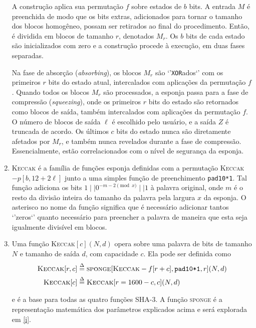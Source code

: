 \documentclass{article}
\begin{document}
\begin{enumerate}[label=(\alph*)]
A construção aplica sua permutação $f$ sobre estados de $b$ bits. A entrada
$M$ é preenchida de modo que os bits extras, adicionados para tornar o tamanho
dos blocos homogêneo, possam ser retirados ao final do procedimento. Então, é
dividida em blocos de tamanho $r$, denotados $M_r$. Os $b$ bits de cada estado
são inicializados com zero e a construção procede à execução, em duas fases
separadas.

Na fase de absorção (\emph{absorbing}), os blocos $M_r$ são `'\verb!XOR!ados`'
com os primeiros $r$ bits do estado atual, intercalados com aplicações da
permutação $f$. Quando todos os blocos $M_r$ são processados, a esponja passa
para a fase de compressão (\emph{squeezing}), onde os primeiros $r$ bits do
estado são retornados como blocos de saída, também intercalados com aplicações
da permutação $f$. O número de blocos de saída $\ell$ é escolhido pelo usuário,
e a saída $Z$ é truncada de acordo. Os últimos $c$ bits do estado nunca são
diretamente afetados por $M_r$, e também nunca revelados durante a fase de
compressão. Essencialmente, estão correlacionados com o nível de segurança da
esponja.

\item \textsc{Keccak} é a família de funções esponja definidas com a
permutação \textsc{Keccak}$-p[b, 12 + 2\ell]$ junto a uma simples função de
preenchimento \texttt{pad10*1}. Tal função adiciona os bits
$1 \mid\mid 0^{-m-2 \pmod{x}} \mid\mid 1$ à palavra original, onde $m$ é o
resto da divisão inteira do tamanho da palavra pela largura $x$ da esponja.
O asterisco no nome da função significa que é necessário adicionar tantos
`'zeros`' quanto necessário para preencher a palavra de maneira que esta
seja igualmente divisível em blocos.

\item Uma função \textsc{Keccak}$[c](N, d)$ opera sobre uma palavra de bits
de tamanho $N$ e tamanho de saída $d$, com capacidade $c$. Ela pode ser
definida como
\begin{align*}
    \textsc{Keccak}[r, c] &\stackrel{\Delta}{=}
    \textsc{sponge}[\textsc{Keccak}-f[r+c], \texttt{pad10*1}, r](N, d) \\
    \textsc{Keccak}[c] &\stackrel{\Delta}{=} \textsc{Keccak}[r=1600-c, c](N, d)
\end{align*}

e é a base para todas as quatro funções SHA-3. A função \textsc{sponge} é a
representação matemática dos parâmetros explicados acima e será explorada em
\ref{i}.


\end{enumerate}
\end{document}
